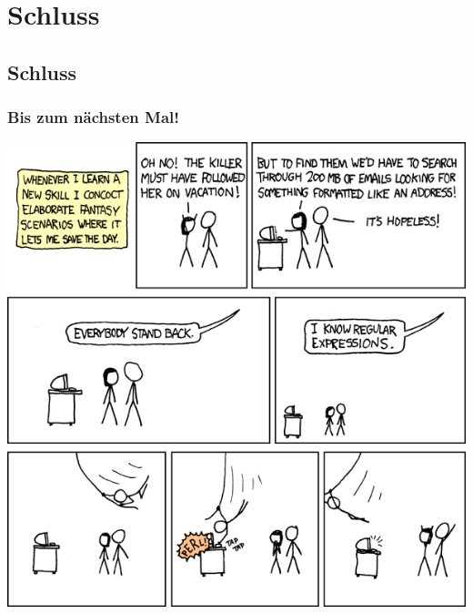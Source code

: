 \section{Schluss}
\subsection{Schluss}

\begin{frame}
\frametitle{Bis zum nächsten Mal!}
\vspace{-0.5cm}
\begin{center}\includegraphics[height=0.8\textheight]{images/regular_expressions.png}\end{center}
\end{frame}


